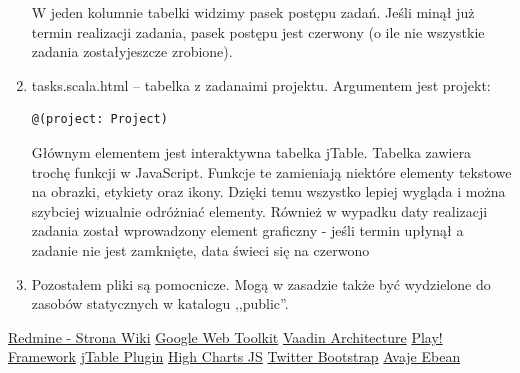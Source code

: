 \documentclass[a4paper,12pt,notitlepage]{mwrep}
\begin{document}
\begin{enumerate}
		W jeden kolumnie tabelki widzimy pasek postępu zadań. Jeśli minął już termin realizacji zadania, pasek postępu jest czerwony (o ile 
		nie wszystkie zadania zostałyjeszcze zrobione).
	\item	tasks.scala.html -- tabelka z zadanaimi projektu. Argumentem jest projekt:
		\begin{verbatim}@(project: Project)\end{verbatim}
		Głównym elementem jest interaktywna tabelka jTable. Tabelka zawiera trochę funkcji w JavaScript. Funkcje te zamieniają niektóre elementy 
		tekstowe na obrazki, etykiety oraz ikony. Dzięki temu wszystko lepiej wygląda i można szybciej wizualnie odróżniać elementy. Również 
		w wypadku daty realizacji zadania został wprowadzony element graficzny - jeśli termin upłynął a zadanie nie jest zamknięte, data świeci 
		się na czerwono
	\item	Pozostałem pliki są pomocnicze. Mogą w zasadzie także być wydzielone do zasobów statycznych w katalogu ,,public''.
	
\end{enumerate}


\addtocounter{page}{-1}

\begin{thebibliography}{9}
	\href{http://www.redmine.org/projects/redmine/wiki/}{Redmine - Strona Wiki}
	\href{https://developers.google.com/web-toolkit/}{Google Web Toolkit}
	\href{https://vaadin.com/book/vaadin7/-/page/architecture.html}{Vaadin Architecture}
	\href{http://www.playframework.com/}{Play! Framework}
	\href{http://jtable.org/}{jTable Plugin}
	\href{http://www.highcharts.com/}{High Charts JS}
	\href{http://twitter.github.io/bootstrap/}{Twitter Bootstrap}
	\href{http://www.avaje.org/}{Avaje Ebean}

\end{thebibliography}


\label{LastPage}
\end{document}
